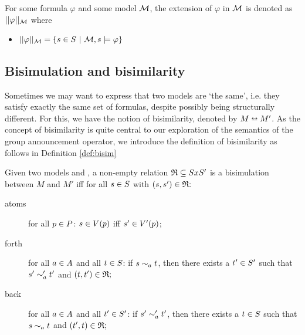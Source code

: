 \begin{definition}
	\label{def:ext}
	For some formula $\varphi$ and some model $\mathcal{M}$, the extension of $\varphi$ in $\mathcal{M}$ is denoted as $||\varphi||_{\mathcal{M}}$ where 
	\begin{itemize}
		\item[] $||\varphi||_{\mathcal{M}} = \{s\in S ~|~\mathcal{M},s\models\varphi\}$
	\end{itemize}
\end{definition}

\subsection{Bisimulation and bisimilarity}


Sometimes we may want to express that two models are `the same', i.e. they satisfy exactly the same set of formulas, despite possibly being structurally different. For this, we have the notion of bisimilarity, denoted by $M \leftrightarroweq M'$. As the concept of bisimilarity is quite central to our exploration of the semantics of the group announcement operator, we introduce the definition of bisimilarity as follows in Definition \ref{def:bisim}

\begin{definition}[Bisimulation]\label{def:bisim}
	Given two models \model{} and , a non-empty relation $\mathfrak{R}\subseteq S x S '$  is a bisimulation between $M$ and $M'$ iff for all $s \in S$ with $(s,s') \in \mathfrak{R}\mathfrak{:}$
	\begin{description}
		\item[atoms] for all $p \in P$: $s\in V(p)$ iff $s'\in V '(p)$;
		\item[forth]  for all $a \in A$ and all $t \in S$: if $s\sim_a t$, then there exists a $t'\in S '$ such that $s'\sim'_a t'$ and $(t,t')\in\mathfrak{R}\mathfrak{;}$
		\item[back] for all $a \in A$ and all $t' \in S'$: if $s'\sim'_a t'$, then there exists a $t\in S $ such that $s\sim_a t$ and $(t',t)\in\mathfrak{R}\mathfrak{;}$
	\end{description}
\end{definition} 

